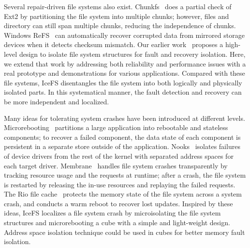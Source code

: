 Several repair-driven file systems also exist. 
Chunkfs~\cite{HensonEtAl06-Chunkfs} does a partial check of Ext2 by
partitioning the file system into multiple chunks; however, files and
directory can still span multiple chunks, reducing the independence of
chunks.  Windows ReFS~\cite{Windows-ReFS} can automatically recover
corrupted data from mirrored storage devices when it detects checksum
mismatch. Our earlier work~\cite{LuEtAl13-HS} proposes a high-level
design to isolate file system structures for fault and recovery
isolation. Here, we extend that work by addressing both reliability
and performance issues with a real prototype and demonstrations for
various applications.  
Compared with these file systems, IceFS disentangles the file
system into both logically and physically isolated parts.  In this
systematical manner, the fault detection and recovery can be more
independent and localized.

Many ideas for tolerating system crashes have been introduced at
different levels.  Microrebooting~\cite{CandeaEtAl04-Reboot}
partitions a large application into rebootable and stateless
components; to recover a failed component, the data state of each
component is persistent in a separate store outside of the
application.  Nooks~\cite{SwiftEtAl03-Nooks} isolates failures of
device drivers from the rest of the kernel with separated address
spaces for each target
driver. Membrane~\cite{SundararamanEtAl10-Membrane} handles file 
system crashes transparently by tracking resource usage and  
the requests at runtime; after a crash, the file system is restarted
by releasing the in-use resources and replaying the failed requests.  
The Rio file cache~\cite{Chen96-Rio} protects the memory state of the
file system across a system crash, and conducts a warm reboot to
recover lost updates.  
Inspired by these ideas, IceFS localizes a file system crash by
microisolating the file system structures and microrebooting a cube
with a simple and light-weight design.
Address space isolation technique could be used in cubes for better
memory fault isolation.   

